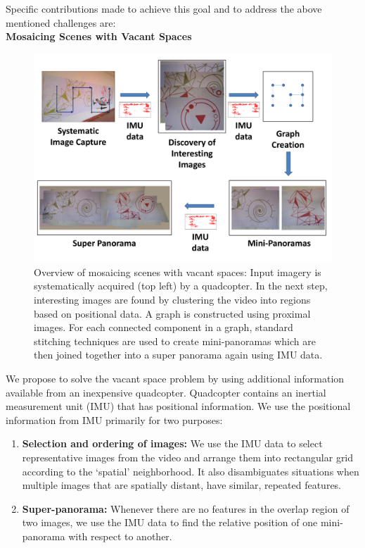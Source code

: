 Specific contributions made to achieve this goal and to address the above
mentioned challenges are:\\

\noindent \textbf{Mosaicing Scenes with Vacant Spaces}\\
\begin{figure}[h!]
	\centering
	\includegraphics[width=0.98\linewidth]{figures/vacantSpaces/Workflow}
	\caption[Workflow]{ Overview of mosaicing scenes with vacant spaces: Input
	imagery is systematically acquired (top left) by a quadcopter.  In the next
    step, interesting images are found by clustering the video into
    regions based on positional data.  A graph is constructed using
    proximal images. For each connected component in a graph, standard
    stitching techniques are used to create mini-panoramas which are
    then joined together into a super panorama 
    again using IMU data.}
    \label{fig:vaccantSpaces_workflow} 
  \end{figure}
  
  We propose to solve the vacant space problem by using additional information
  available from an inexpensive quadcopter.  Quadcopter contains an inertial
measurement unit (IMU) that has positional information. We use the positional
information from IMU primarily for two purposes:
\begin{enumerate}
\item \textbf{Selection and ordering of images:}
We use the IMU data to select representative images from the video and arrange
them into rectangular grid according to the `spatial' neighborhood. It also
  disambiguates situations when multiple images that are spatially distant,
  have similar, repeated features.

\item \textbf{Super-panorama:} Whenever there are no features in
  the overlap region of two images, we use the IMU data to find the
  relative position of one mini-panorama with respect to another.
\end{enumerate}


